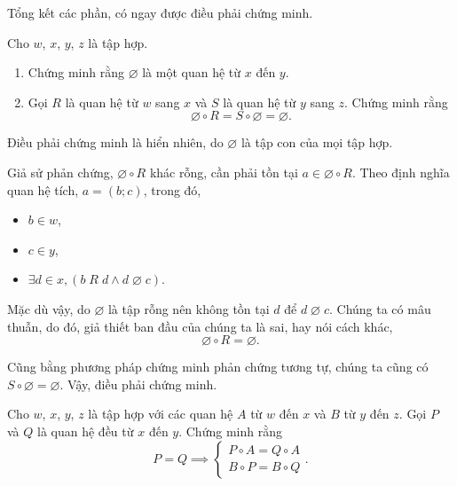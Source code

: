 Tổng kết các phần, có ngay được điều phải chứng minh.

\exercise Cho $w$, $x$, $y$, $z$ là tập hợp.
\begin{enumerate}
   \item Chứng minh rằng $\varnothing$ là một quan hệ từ $x$ đến $y$.
   \item Gọi $R$ là quan hệ từ $w$ sang $x$ và $S$ là quan hệ từ $y$ sang $z$. Chứng minh rằng \begin{equation*}
      \varnothing \circ R = S \circ \varnothing = \varnothing.
   \end{equation*}
\end{enumerate}

\solution

\resetSubexercise Điều phải chứng minh là hiển nhiên, do $\varnothing$ là tập con của mọi tập hợp.

\stepSubexercise Giả sử phản chứng, $\varnothing \circ R$ khác rỗng, cần phải tồn tại $a \in \varnothing \circ R$. Theo định nghĩa quan hệ tích, $a = (b; c)$, trong đó, 
\begin{itemize}
   \item $b \in w$, 
   \item $c \in y$, 
   \item $\exists d \in x, (b\;R\;d \land d\;\varnothing\;c)$.
\end{itemize}
Mặc dù vậy, do $\varnothing$ là tập rỗng nên không tồn tại $d$ để $d\;\varnothing\;c$. Chúng ta có mâu thuẫn, do đó, giả thiết ban đầu của chúng ta là sai, hay nói cách khác, \begin{equation*}
   \varnothing \circ R = \varnothing.
\end{equation*}

Cũng bằng phương pháp chứng minh phản chứng tương tự, chúng ta cũng có $S \circ \varnothing = \varnothing$. Vậy, điều phải chứng minh.

\exercise Cho $w$, $x$, $y$, $z$ là tập hợp với các quan hệ $A$ từ $w$ đến $x$ và $B$ từ $y$ đến $z$. Gọi $P$ và $Q$ là quan hệ đều từ $x$ đến $y$. Chứng minh rằng
\begin{equation*}
   P = Q \implies \begin{cases}
      P \circ A = Q \circ A \\
      B \circ P = B \circ Q
   \end{cases}.
\end{equation*}

\solution

